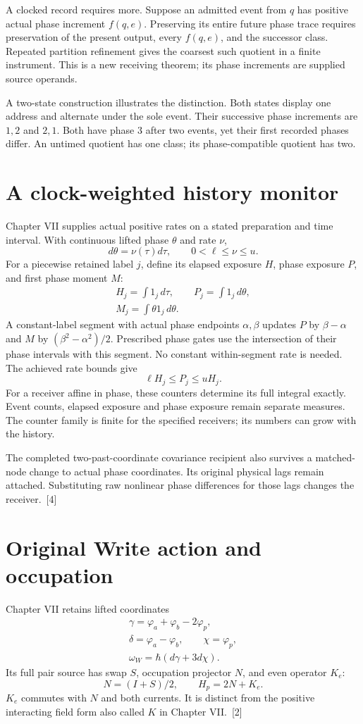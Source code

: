 \documentclass[10pt,twocolumn,letterpaper]{article}
\begin{document}
A clocked record requires more. Suppose an admitted event from $q$ has positive actual phase increment $f(q,e)$. Preserving its entire future phase trace requires preservation of the present output, every $f(q,e)$, and the successor class. Repeated partition refinement gives the coarsest such quotient in a finite instrument. This is a new receiving theorem; its phase increments are supplied source operands.

A two-state construction illustrates the distinction. Both states display one address and alternate under the sole event. Their successive phase increments are $1,2$ and $2,1$. Both have phase $3$ after two events, yet their first recorded phases differ. An untimed quotient has one class; its phase-compatible quotient has two.

\section{A clock-weighted history monitor}
Chapter VII supplies actual positive rates on a stated preparation and time interval. With continuous lifted phase $\theta$ and rate $\nu$,
\[
d\theta=\nu(\tau)d\tau,\qquad 0<\ell\leq\nu\leq u.
\]
For a piecewise retained label $j$, define its elapsed exposure $H$, phase exposure $P$, and first phase moment $M$:
\[
\begin{gathered}
H_j=\int 1_j\,d\tau,\qquad P_j=\int 1_j\,d\theta,\\
M_j=\int \theta 1_j\,d\theta.
\end{gathered}
\]
A constant-label segment with actual phase endpoints $\alpha,\beta$ updates $P$ by $\beta-\alpha$ and $M$ by $(\beta^2-\alpha^2)/2$. Prescribed phase gates use the intersection of their phase intervals with this segment. No constant within-segment rate is needed. The achieved rate bounds give
\[
\ell H_j\leq P_j\leq uH_j.
\]
For a receiver affine in phase, these counters determine its full integral exactly. Event counts, elapsed exposure and phase exposure remain separate measures. The counter family is finite for the specified receivers; its numbers can grow with the history.

The completed two-past-coordinate covariance recipient also survives a matched-node change to actual phase coordinates. Its original physical lags remain attached. Substituting raw nonlinear phase differences for those lags changes the receiver.~[4]

\section{Original Write action and occupation}
Chapter VII retains lifted coordinates
\[
\begin{gathered}
\gamma=\varphi_a+\varphi_b-2\varphi_p,\\
\delta=\varphi_a-\varphi_b,\qquad \chi=\varphi_p,\\
\omega_W=\hbar(d\gamma+3d\chi).
\end{gathered}
\]
Its full pair source has swap $S$, occupation projector $N$, and even operator $K_e$:
\[
N=(I+S)/2,\qquad H_p=2N+K_e.
\]
$K_e$ commutes with $N$ and both currents. It is distinct from the positive interacting field form also called $K$ in Chapter VII.~[2]
\end{document}
